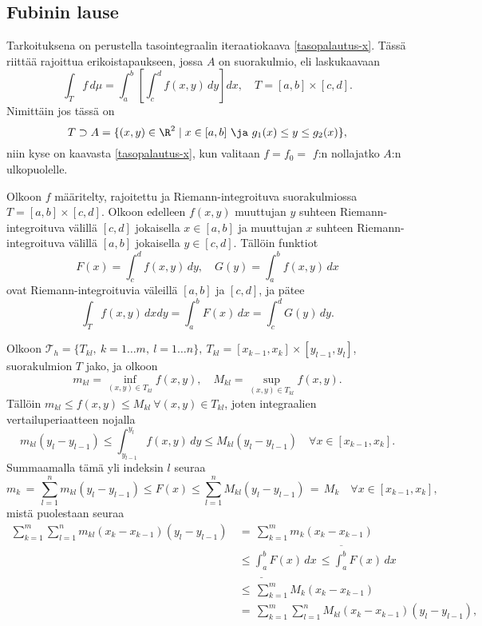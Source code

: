 \subsection*{Fubinin lause}

Tarkoituksena on perustella tasointegraalin iteraatiokaava \eqref{tasopalautus-x}. Tässä riittää
rajoittua erikoistapaukseen, jossa $A$ on suorakulmio, eli laskukaavaan
\[
\int_T f\,d\mu = \int_a^b\left[\int_c^d f(x,y)\,dy\right]dx, \quad T = [a,b] \times [c,d].
\]
Nimittäin jos tässä on
\[ 
T \supset A = \{(x,y) \in \R^2 \mid x \in [a,b]\ \ja\ g_1(x) \le y \le g_2(x) \}, 
\]
niin kyse on kaavasta \eqref{tasopalautus-x}, kun valitaan $f=f_0=$ $f$:n nollajatko $A$:n 
ulkopuolelle.
\begin{Lause} \label{Fubini}  
Olkoon $f$ määritelty, rajoitettu ja 
Riemann-integroituva suorakulmiossa $T=[a,b]\times [c,d]$. Olkoon edelleen $f(x,y)$ muuttujan
$y$ suhteen Riemann-integroituva välillä $[c,d]$ jokaisella $x \in [a,b]$ ja muuttujan $x$ 
suhteen Riemann-integroituva välillä $[a,b]$ jokaisella $y \in [c,d]$. Tällöin funktiot
\[ 
F(x) = \int_c^d f(x,y)\,dy, \quad G(y) = \int_a^b f(x,y)\,dx 
\]
ovat Riemann-integroituvia väleillä $[a,b]$ ja $[c,d]$, ja pätee
\[ 
\int_T f(x,y)\,dxdy = \int_a^b F(x)\,dx = \int_c^d G(y)\,dy. 
\]
\end{Lause}
\tod Olkoon $\mathcal{T}_h = \{T_{kl},\ k=1\ldots m,\ l=1\ldots n\},\ 
T_{kl}=[x_{k-1},x_k]\times[y_{l-1},y_l]$, suorakulmion $T$ jako, ja olkoon
\[ 
m_{kl} = \inf_{(x,y) \in T_{kl}} f(x,y), \quad M_{kl} = \sup_{(x,y) \in T_{kl}} f(x,y). 
\]
Tällöin $m_{kl} \le f(x,y) \le M_{kl}\ \forall (x,y) \in T_{kl}$, joten integraalien 
vertailuperiaatteen nojalla
\[ 
m_{kl}(y_l-y_{l-1}) \le \int_{y_{l-1}}^{y_l} f(x,y)\,dy 
                    \le M_{kl}(y_l-y_{l-1}) \quad \forall x \in [x_{k-1},x_k]. 
\]
Summaamalla tämä yli indeksin $l$ seuraa
\[ 
m_k\,=\,\sum_{l=1}^n m_{kl}(y_l-y_{l-1}) \le F(x) 
         \le \sum_{l=1}^n M_{kl}(y_l-y_{l-1})\,=\,M_k \quad \forall x \in [x_{k-1},x_k], 
\]
mistä puolestaan seuraa
\begin{align*}
\sum_{k=1}^m\sum_{l=1}^n m_{kl}(x_k-x_{k-1})(y_l-y_{l-1})\,
                &=\,\sum_{k=1}^m m_k(x_k-x_{k-1}) \\
                &\le \underline{\int_a^b}F(x)\,dx\,\le \overline{\int_a^b}F(x)\,dx \\
                &\le\,\sum_{k=1}^m M_k(x_k-x_{k-1}) \\
                &=\,\sum_{k=1}^m\sum_{l=1}^n M_{kl}(x_k-x_{k-1})(y_l-y_{l-1}),
\end{align*}

